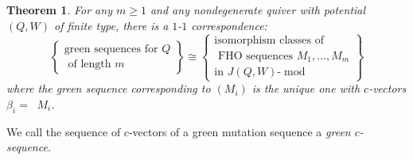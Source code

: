 \documentclass[10pt]{amsart}
\newtheorem{theo}{Theorem}[section]
\theoremstyle{definition}
\DeclareMathOperator{\undim}{\underline{dim}}
\DeclareMathOperator{\modr}{mod}
\begin{document}
\begin{theo}\label{thm: inductive thm implying main thm}
For any $m\ge1$ and any nondegenerate quiver with potential $(Q,W)$ of finite type, there is a $1$-$1$ correspondence:
\[
\left\{\begin{array}{c}
\text{green sequences for $Q$}\\
\text{ of length $m$}
\end{array}
\right\}\cong 
\left\{
\begin{array}{c}
\text{isomorphism classes of}\\
\text{ FHO sequences $M_1,\ldots,M_m$}\\
\text{in $J(Q,W)\text{-}\modr $}
\end{array}
\right\}
\]
where the green sequence corresponding to $(M_i)$ is the unique one with $c$-vectors $\beta_i=\undim M_i$.
\end{theo}

We call the sequence of $c$-vectors of a green mutation sequence a \emph{green $c$-sequence}.
\end{document}
